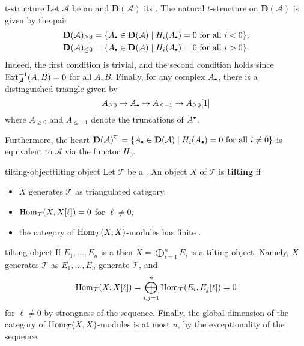 \begin{example}{t-structure}
    Let $\mathcal{A}$ be an  and $\textbf{D}(\mathcal{A})$ its . The natural $t$-structure on $\textbf{D}(\mathcal{A})$ is given by the pair
    \[ \begin{aligned}
        \textbf{D}(\mathcal{A})_{\ge 0} &= \{ A_\bdot \in \textbf{D}(\mathcal{A}) \mid H_i(A_\bdot) = 0 \textup{ for all } i < 0 \} , \\
        \textbf{D}(\mathcal{A})_{\le 0} &= \{ A_\bdot \in \textbf{D}(\mathcal{A}) \mid H_i(A_\bdot) = 0 \textup{ for all } i > 0 \} .
    \end{aligned} \]
    Indeed, the first condition is trivial, and the second condition holds since $\textup{Ext}_\mathcal{A}^{-1}(A, B) = 0$ for all $A, B$. Finally, for any complex $A_\bdot$, there is a distinguished triangle given by
    \[ A_{\ge 0} \to A_\bdot \to A_{\le -1} \to A_{\ge 0}[1] \]
    where $A_{\ge 0}$ and $A_{\le -1}$ denote the truncations of $A^\bdot$.
    
    Furthermore, the heart $\textbf{D}(\mathcal{A})^\heartsuit = \{ A_\bdot \in \textbf{D}(\mathcal{A}) \mid H_i(A_\bdot) = 0 \textup{ for all } i \ne 0 \}$ is equivalent to $\mathcal{A}$ via the functor $H_0$.
\end{example}

\begin{topic}{tilting-object}{tilting object}
    Let $\mathcal{T}$ be a . An object $X$ of $\mathcal{T}$ is \textbf{tilting} if
    \begin{itemize}
        \item $X$ generates $\mathcal{T}$ as triangulated category,
        \item $\operatorname{Hom}_\mathcal{T}(X, X[\ell]) = 0$ for $\ell \ne 0$,
        \item the category of $\operatorname{Hom}_{\mathcal{T}}(X, X)$-modules has finite .
    \end{itemize}
\end{topic}

\begin{example}{tilting-object}
    If $E_1, \ldots, E_n$ is a  then $X = \bigoplus_{i = 1}^{n} E_i$ is a tilting object. Namely, $X$ generates $\mathcal{T}$ as $E_1, \ldots, E_n$ generate $\mathcal{T}$, and
    \[ \operatorname{Hom}_\mathcal{T}(X, X[\ell]) = \bigoplus_{i, j = 1}^{n} \operatorname{Hom}_\mathcal{T}(E_i, E_j[\ell]) = 0 \]
    for $\ell \ne 0$ by strongness of the sequence. Finally, the global dimension of the category of $\operatorname{Hom}_\mathcal{T}(X, X)$-modules is at most $n$, by the exceptionality of the sequence.
\end{example}
